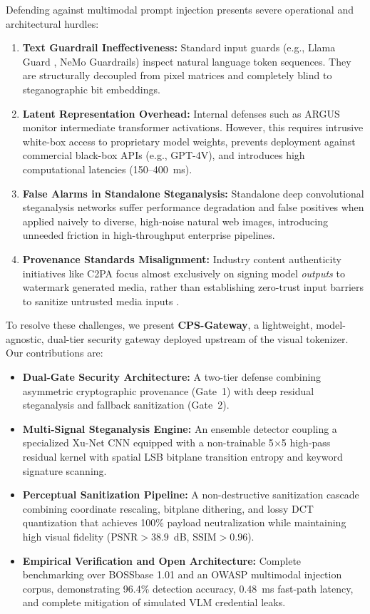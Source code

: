 \documentclass[conference]{IEEEtran}
\begin{document}
Defending against multimodal prompt injection presents severe operational and architectural hurdles:
\begin{enumerate}
    \item \textbf{Text Guardrail Ineffectiveness:} Standard input guards (e.g., Llama Guard \cite{inan2023llama}, NeMo Guardrails) inspect natural language token sequences. They are structurally decoupled from pixel matrices and completely blind to steganographic bit embeddings.
    \item \textbf{Latent Representation Overhead:} Internal defenses such as ARGUS \cite{wang2024argus} monitor intermediate transformer activations. However, this requires intrusive white-box access to proprietary model weights, prevents deployment against commercial black-box APIs (e.g., GPT-4V), and introduces high computational latencies (150--400~ms).
    \item \textbf{False Alarms in Standalone Steganalysis:} Standalone deep convolutional steganalysis networks suffer performance degradation and false positives when applied naively to diverse, high-noise natural web images, introducing unneeded friction in high-throughput enterprise pipelines.
    \item \textbf{Provenance Standards Misalignment:} Industry content authenticity initiatives like C2PA \cite{c2pa2023spec} focus almost exclusively on signing model \textit{outputs} to watermark generated media, rather than establishing zero-trust input barriers to sanitize untrusted media inputs \cite{fisch2024visualtrust}.
\end{enumerate}

To resolve these challenges, we present \textbf{CPS-Gateway}, a lightweight, model-agnostic, dual-tier security gateway deployed upstream of the visual tokenizer. Our contributions are:
\begin{itemize}
    \item \textbf{Dual-Gate Security Architecture:} A two-tier defense combining asymmetric cryptographic provenance (Gate~1) with deep residual steganalysis and fallback sanitization (Gate~2).
    \item \textbf{Multi-Signal Steganalysis Engine:} An ensemble detector coupling a specialized Xu-Net CNN equipped with a non-trainable 5$\times$5 high-pass residual kernel with spatial LSB bitplane transition entropy and keyword signature scanning.
    \item \textbf{Perceptual Sanitization Pipeline:} A non-destructive sanitization cascade combining coordinate rescaling, bitplane dithering, and lossy DCT quantization that achieves 100\% payload neutralization while maintaining high visual fidelity ($\text{PSNR} > 38.9$~dB, $\text{SSIM} > 0.96$).
    \item \textbf{Empirical Verification and Open Architecture:} Complete benchmarking over BOSSbase 1.01 and an OWASP multimodal injection corpus, demonstrating 96.4\% detection accuracy, 0.48~ms fast-path latency, and complete mitigation of simulated VLM credential leaks.
\end{itemize}
\end{document}
